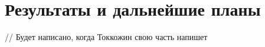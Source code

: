 \section{Результаты и дальнейшие планы}
\label{section.output}
// Будет написано, когда Токкожин свою часть напишет

\newpage
